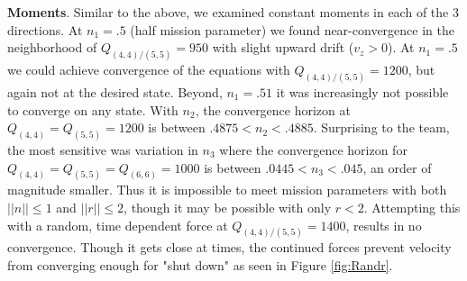 \documentclass{article}
\begin{document}
\begin{multicols}{2}
\noindent\textbf{Moments}.  Similar to the above, we examined constant moments in each of the 3 directions.  At $n_1=.5$ (half mission parameter) we found near-convergence in the neighborhood of $Q_{(4,4)/(5,5)}=950$ with slight upward drift ($v_z>0$).  At $n_1=.5$ we could achieve convergence of the equations with $Q_{(4,4)/(5,5)}=1200$, but again not at the desired state.  Beyond, $n_1=.51$ it was increasingly not possible to converge on any state.  With $n_2$, the convergence horizon at $Q_{(4,4)}=Q_{(5,5)}=1200$ is between $.4875<n_2<.4885$. Surprising to the team, the most sensitive was variation in $n_3$ where the convergence horizon for $Q_{(4,4)}=Q_{(5,5)}=Q_{(6,6)}=1000$ is between $.0445<n_3<.045$, an order of magnitude smaller. Thus it is impossible to meet mission parameters with both  $||n||\leq1$ and $||r||\leq2$, though it may be possible with only $r<2$.  Attempting this with a random, time dependent force at $Q_{(4,4)/(5,5)}=1400$, results in no convergence.  Though it gets close at times, the continued forces prevent velocity from converging enough for "shut down" as seen in Figure \ref{fig:Randr}.


\end{multicols}
\end{document}
